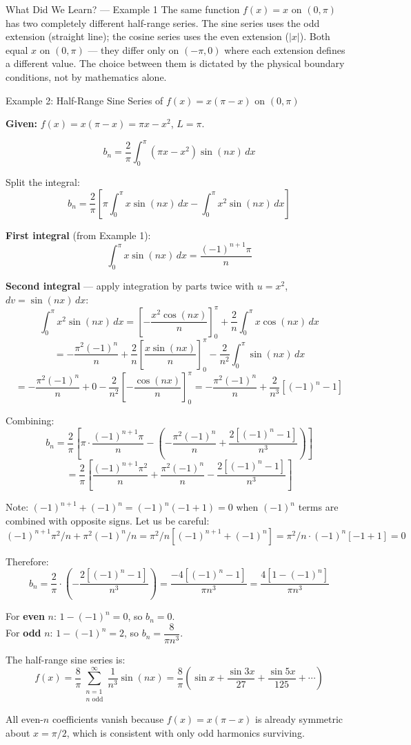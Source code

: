 \documentclass[12pt,a4paper]{article}
\begin{document}
\begin{learnbox}{What Did We Learn? --- Example 1}
The same function $f(x)=x$ on $(0,\pi)$ has two completely different half-range series. The sine series uses the odd extension (straight line); the cosine series uses the even extension ($|x|$). Both equal $x$ on $(0,\pi)$ --- they differ only on $(-\pi,0)$ where each extension defines a different value. The choice between them is dictated by the physical boundary conditions, not by mathematics alone.
\end{learnbox}

\begin{infobox}{Example 2: Half-Range Sine Series of $f(x)=x(\pi-x)$ on $(0,\pi)$}

\textbf{Given:} $f(x) = x(\pi - x) = \pi x - x^2$, $L = \pi$.

\[
  b_n = \frac{2}{\pi}\int_0^{\pi}(\pi x - x^2)\sin(nx)\,dx
\]

Split the integral:
\[
  b_n = \frac{2}{\pi}\left[\pi\int_0^{\pi}x\sin(nx)\,dx - \int_0^{\pi}x^2\sin(nx)\,dx\right]
\]

\textbf{First integral} (from Example 1):
\[
  \int_0^{\pi}x\sin(nx)\,dx = \frac{(-1)^{n+1}\pi}{n}
\]

\textbf{Second integral} --- apply integration by parts twice with $u = x^2$, $dv = \sin(nx)\,dx$:
\[
  \int_0^{\pi}x^2\sin(nx)\,dx
  = \left[-\frac{x^2\cos(nx)}{n}\right]_0^{\pi} + \frac{2}{n}\int_0^{\pi}x\cos(nx)\,dx
\]
\[
  = -\frac{\pi^2(-1)^n}{n} + \frac{2}{n}\left[\frac{x\sin(nx)}{n}\right]_0^{\pi} - \frac{2}{n^2}\int_0^{\pi}\sin(nx)\,dx
\]
\[
  = -\frac{\pi^2(-1)^n}{n} + 0 - \frac{2}{n^2}\left[-\frac{\cos(nx)}{n}\right]_0^{\pi}
  = -\frac{\pi^2(-1)^n}{n} + \frac{2}{n^3}\left[(-1)^n - 1\right]
\]

Combining:
\[
  b_n = \frac{2}{\pi}\left[\pi\cdot\frac{(-1)^{n+1}\pi}{n} - \left(-\frac{\pi^2(-1)^n}{n} + \frac{2[(-1)^n-1]}{n^3}\right)\right]
\]
\[
  = \frac{2}{\pi}\left[\frac{(-1)^{n+1}\pi^2}{n} + \frac{\pi^2(-1)^n}{n} - \frac{2[(-1)^n-1]}{n^3}\right]
\]

Note: $(-1)^{n+1} + (-1)^n = (-1)^n(-1 + 1) = 0$ when $(-1)^n$ terms are combined with opposite signs. Let us be careful:
\[
  (-1)^{n+1}\pi^2/n + \pi^2(-1)^n/n = \pi^2/n[(-1)^{n+1}+(-1)^n] = \pi^2/n\cdot(-1)^n[-1+1] = 0
\]

Therefore:
\[
  b_n = \frac{2}{\pi}\cdot\left(-\frac{2[(-1)^n - 1]}{n^3}\right) = \frac{-4[(-1)^n-1]}{\pi n^3} = \frac{4[1-(-1)^n]}{\pi n^3}
\]

For \textbf{even} $n$: $1 - (-1)^n = 0$, so $b_n = 0$.\\
For \textbf{odd} $n$: $1 - (-1)^n = 2$, so $b_n = \dfrac{8}{\pi n^3}$.

The half-range sine series is:
\[
  f(x) = \frac{8}{\pi}\sum_{\substack{n=1 \\ n\text{ odd}}}^{\infty}\frac{1}{n^3}\sin(nx)
  = \frac{8}{\pi}\left(\sin x + \frac{\sin 3x}{27} + \frac{\sin 5x}{125} + \cdots\right)
\]

All even-$n$ coefficients vanish because $f(x)=x(\pi-x)$ is already symmetric about $x=\pi/2$, which is consistent with only odd harmonics surviving.
\end{infobox}
\end{document}
